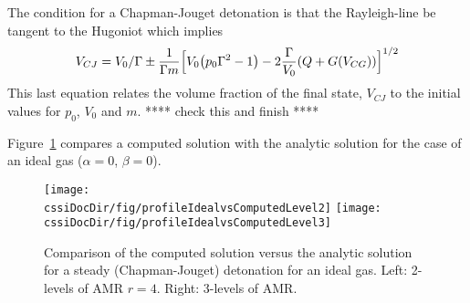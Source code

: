 \documentclass{article}
\newcommand{\obDir}{\homeHenshaw/res/OverBlown}
\newcommand{\cssiDocDir}{../cssi}
\begin{document}

The condition for a Chapman-Jouget detonation is that the Rayleigh-line be tangent to the Hugoniot
which implies
\[
   V_{CJ} = V_0/\Gamma \pm 
    {1\over \Gamma m} \Big[ V_0\big( p_0 \Gamma^2 -1\big) -2 {\Gamma\over V_0} ( Q+G(V_{CG})) \Big]^{1/2}
\] 
This last equation relates the volume fraction of the final state, $V_{CJ}$ to the initial values
for $p_0$, $V_0$ and $m$. **** check this and finish ****

Figure~\ref{fig:detonationCJIdealComparison} compares a computed solution with the analytic solution
for the case of an ideal gas ($\alpha=0$, $\beta=0$).
\begin{figure}[hbt]
\begin{center}
  \texttt{[image: \\cssiDocDir/fig/profileIdealvsComputedLevel2]}
  \texttt{[image: \\cssiDocDir/fig/profileIdealvsComputedLevel3]}
 \end{center}
\caption{Comparison of the computed solution versus the analytic solution for a steady (Chapman-Jouget) detonation for an ideal gas. Left: 2-levels of AMR $r=4$. Right: 3-levels of AMR. } \label{fig:detonationCJIdealComparison}
\end{figure}




\end{document}
